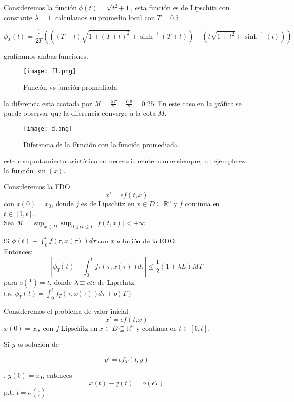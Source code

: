 \begin{example}
	Consideremos la función $\phi(t)=\sqrt{t^2+1}$, esta función es de Lipschitz
	con constante $\lambda=1$, calculamos su promedio local con $T=0.5$

	$$\phi_T(t)=\frac{1}{2T}(((T + t)\sqrt{1 + (T + t)^2} + \sinh^{-1}(T + t)) - (t\sqrt{1 + t^2} + \sinh^{-1}(t)))$$

	graficamos ambas funciones.

	\begin{figure}[h]
		\centering
		\texttt{[image: fl.png]}
		\caption{Función vs  función promediada.}
	\end{figure}

	la diferencia esta acotada por $M=\frac{\lambda T}{2}=\frac{0.5}{2}=0.25$. En este caso en la
	gráfica se puede observar que la diferencia converge a la cota $M$.

	\begin{figure}[h]
		\centering
		\texttt{[image: d.png]}
		\caption{Diferencia de la Función con la función promediada.}
	\end{figure}

\end{example}

este comportamiento asintótico no necesariamente ocurre siempre, un ejemplo es la función $\sin(x)$. 

\begin{lemma}
	Consideremos la EDO
	\[
		x'=\epsilon f(t,x)
	\]
	con $x(0)=x_0$, donde $f$ es de Lipschitz en $x\in D\subseteq\mathbb{R}^n$
	y $f$ continua en $t\in[0,t]$.\\
	Sea $M=\sup_{x\in D} \sup_{0\leq\epsilon t\leq L} \left|f(t,x)\right|<+\infty$

	Si $\phi(t)=\int_{0}^{t}f(\tau,x(\tau))d\tau$ con $x$ solución de la EDO.
	\\Entonces:
	\[
		|\phi_T(t)-\int_{0}^{t}f_T(\tau,x(\tau))d\tau|\leq\frac{1}{2}(1+\lambda L)MT
	\]
	para $o(\frac{1}{\epsilon})=t$, donde $\lambda\equiv cte$ de Lipschitz.
	\\i.e. $\phi_T(t)=\int_{0}^{t}f_T(\tau,x(\tau))d\tau+o(T)$
\end{lemma}

\begin{lemma}
	Consideremos el problema de valor inicial
	\[
		x'=\epsilon f(t,x)
	\]
	$x(0)=x_0$, con $f$ Lipschitz en $x\in D\subseteq\mathbb{R}^n$ y continua
	en $t\in[0,t]$.

	Si $y$ es solución de 

	\begin{equation}
		y'=\epsilon f_T(t,y)
	\end{equation}
	
	, $y(0)=x_0$, entonces
	\[
		x(t)-y(t)=o(\epsilon T)
	\]
	p.t. $t=o(\frac{1}{\epsilon})$
\end{lemma}

